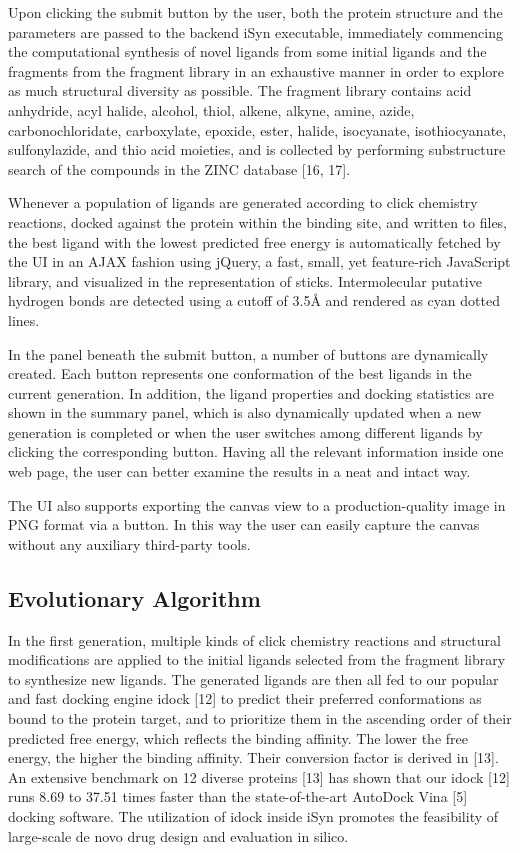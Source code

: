 Upon clicking the submit button by the user, both the protein structure and the parameters are passed to the backend iSyn executable, immediately commencing the computational synthesis of novel ligands from some initial ligands and the fragments from the fragment library in an exhaustive manner in order to explore as much structural diversity as possible. The fragment library contains acid anhydride, acyl halide, alcohol, thiol, alkene, alkyne, amine, azide, carbonochloridate, carboxylate, epoxide, ester, halide, isocyanate, isothiocyanate, sulfonylazide, and thio acid moieties, and is collected by performing substructure search of the compounds in the ZINC database [16, 17].

Whenever a population of ligands are generated according to click chemistry reactions, docked against the protein within the binding site, and written to files, the best ligand with the lowest predicted free energy is automatically fetched by the UI in an AJAX fashion using jQuery, a fast, small, yet feature-rich JavaScript library, and visualized in the representation of sticks. Intermolecular putative hydrogen bonds are detected using a cutoff of 3.5Å and rendered as cyan dotted lines.

In the panel beneath the submit button, a number of buttons are dynamically created. Each button represents one conformation of the best ligands in the current generation. In addition, the ligand properties and docking statistics are shown in the summary panel, which is also dynamically updated when a new generation is completed or when the user switches among different ligands by clicking the corresponding button. Having all the relevant information inside one web page, the user can better examine the results in a neat and intact way.

The UI also supports exporting the canvas view to a production-quality image in PNG format via a button. In this way the user can easily capture the canvas without any auxiliary third-party tools.

\subsection{Evolutionary Algorithm}

In the first generation, multiple kinds of click chemistry reactions and structural modifications are applied to the initial ligands selected from the fragment library to synthesize new ligands. The generated ligands are then all fed to our popular and fast docking engine idock [12] to predict their preferred conformations as bound to the protein target, and to prioritize them in the ascending order of their predicted free energy, which reflects the binding affinity. The lower the free energy, the higher the binding affinity. Their conversion factor is derived in [13]. An extensive benchmark on 12 diverse proteins [13] has shown that our idock [12] runs 8.69 to 37.51 times faster than the state-of-the-art AutoDock Vina [5] docking software. The utilization of idock inside iSyn promotes the feasibility of large-scale de novo drug design and evaluation in silico.

